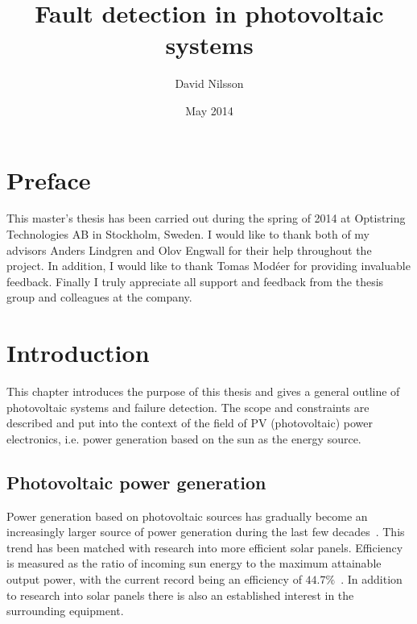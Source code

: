 


\title{Fault detection in photovoltaic systems}
\author{David Nilsson}

\date{May 2014}


\frontmatter
\pagestyle{empty}
\maketitle
{}



\clearpage
\tableofcontents*
\mainmatter
\pagestyle{newchap}

\chapter*{Preface}
This master's thesis has been carried out during the spring of 2014 at Optistring Technologies AB in Stockholm, Sweden.
I would like to thank both of my advisors Anders Lindgren and Olov Engwall for their help throughout the project.
In addition, I would like to thank Tomas Modéer for providing invaluable feedback.
Finally I truly appreciate all support and feedback from the thesis group and colleagues at the company.

\printglossaries
\cleardoublepage
\listoffigures
\clearpage
{}

\chapter{Introduction}
This chapter introduces the purpose of this thesis and gives a general outline of photovoltaic systems and failure detection.
The scope and constraints are described and put into the context of the field of PV (photovoltaic) power electronics, i.e. power generation based on the sun as the energy source.

\section{Photovoltaic power generation}
Power generation based on photovoltaic sources has gradually become an increasingly larger source of power generation during the last few decades~\cite{Zhao2010thesis}.
This trend has been matched with research into more efficient solar panels.
Efficiency is measured as the ratio of incoming sun energy to the maximum attainable output power, with the current record being an efficiency of $44.7\%$~\cite{Fraunhofer2013}.
In addition to research into solar panels there is also an established interest in the surrounding equipment.

